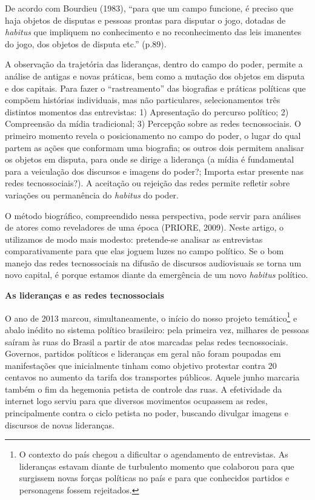 De acordo com Bourdieu (1983), ``para que um campo funcione, é preciso
que haja objetos de disputas e pessoas prontas para disputar o jogo,
dotadas de \emph{habitus} que impliquem no conhecimento e no
reconhecimento das leis imanentes do jogo, dos objetos de disputa etc.''
(p.89).

A observação da trajetória das lideranças, dentro do campo do poder,
permite a análise de antigas e novas práticas, bem como a mutação dos
objetos em disputa e dos capitais. Para fazer o ``rastreamento'' das
biografias e práticas políticas que compõem histórias individuais, mas
não particulares, selecionamentos três distintos momentos das
entrevistas: 1) Apresentação do percurso político; 2) Compreensão da
mídia tradicional; 3) Percepção sobre as redes tecnossociais. O primeiro
momento revela o posicionamento no campo do poder, o lugar do qual
partem as ações que conformam uma biografia; os outros dois permitem
analisar os objetos em disputa, para onde se dirige a liderança (a mídia
é fundamental para a veiculação dos discursos e imagens do poder?;
Importa estar presente nas redes tecnossociais?). A aceitação ou
rejeição das redes permite refletir sobre variações ou permanência do
\emph{habitus} do poder.

O método biográfico, compreendido nessa perspectiva, pode servir para
análises de atores como reveladores de uma época (PRIORE, 2009). Neste
artigo, o utilizamos de modo mais modesto: pretende-se analisar as
entrevistas comparativamente para que elas joguem luzes no campo
político. Se o bom manejo das redes tecnossociais na difusão de
discursos audiovisuais se torna um novo capital, é porque estamos diante
da emergência de um novo \emph{habitus} político.

\textbf{As lideranças e as redes tecnossociais}

O ano de 2013 marcou, simultaneamente, o início do nosso projeto
temático\footnote{O contexto do país chegou a dificultar o agendamento
  de entrevistas. As lideranças estavam diante de turbulento momento que
  colaborou para que surgissem novas forças políticas no país e para que
  conhecidos partidos e personagens fossem rejeitados.} e abalo inédito
no sistema político brasileiro: pela primeira vez, milhares de pessoas
saíram às ruas do Brasil a partir de atos marcadas pelas redes
tecnossociais. Governos, partidos políticos e lideranças em geral não
foram poupadas em manifestações que inicialmente tinham como objetivo
protestar contra 20 centavos no aumento da tarifa dos transportes
públicos. Aquele junho marcaria também o fim da hegemonia petista de
controle das ruas. A efetividade da internet logo serviu para que
diversos movimentos ocupassem as redes, principalmente contra o ciclo
petista no poder, buscando divulgar imagens e discursos de novas
lideranças.

